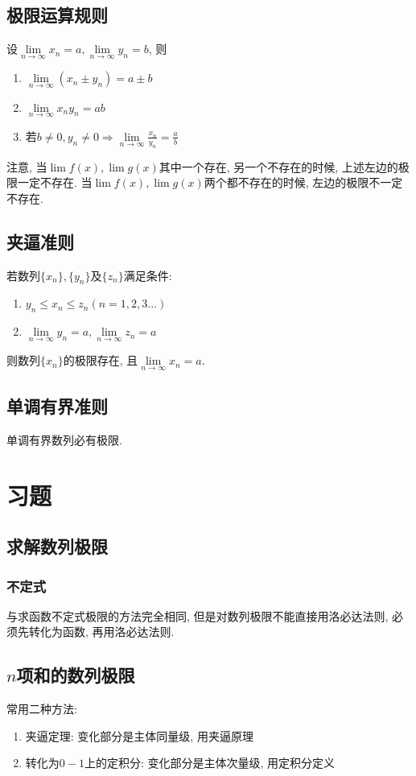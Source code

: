 \subsection{极限运算规则}
设$ \lim\limits_{n\rightarrow \infty}x_{n}=a, \lim\limits_{n\rightarrow \infty}y_{n}=b $, 则
\begin{enumerate}
\item $ \lim\limits_{n\rightarrow \infty}(x_{n}\pm y_{n})=a\pm b $
\item $ \lim\limits_{n\rightarrow \infty}x_{n}y_{n}=ab $
\item 若$ b\neq 0, y_{n}\neq 0 \Rightarrow \lim\limits_{n\rightarrow \infty}\frac{x_{n}}{y_{n}}=\frac{a}{b}$
\end{enumerate}\par
注意, 当$ \lim\limits f(x), \lim\limits g(x) $其中一个存在, 另一个不存在的时候, 上述左边的极限一定不存在. 当$ \lim\limits f(x), \lim\limits g(x) $两个都不存在的时候, 左边的极限不一定不存在.
\subsection{夹逼准则}
若数列$ \{x_{n}\}, \{y_{n}\} $及$ \{z_{n}\} $满足条件:
\begin{enumerate}
\item $ y_{n}\le x_{n}\le z_{n}(n=1,2,3...) $
\item $ \lim\limits_{n\rightarrow \infty}y_{n}=a, \lim\limits_{n\rightarrow \infty}z_{n}=a $
\end{enumerate}\par
则数列$ \{x_{n}\} $的极限存在, 且$ \lim\limits_{n\rightarrow \infty}x_{n}=a $.
\subsection{单调有界准则}
单调有界数列必有极限.
\section{习题}
\subsection{求解数列极限}
\subsubsection{不定式}
与求函数不定式极限的方法完全相同, 但是对数列极限不能直接用洛必达法则, 必须先转化为函数, 再用洛必达法则.
\subsection{$ n $项和的数列极限}
常用二种方法:
\begin{enumerate}
\item 夹逼定理: 变化部分是主体同量级, 用夹逼原理
\item 转化为$ 0-1 $上的定积分: 变化部分是主体次量级, 用定积分定义
\end{enumerate}
